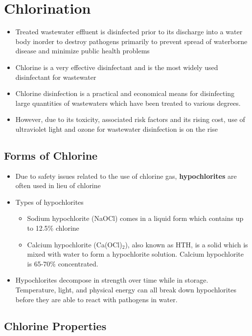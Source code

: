 \newpage
\section{Chlorination}


\begin{itemize}
\item Treated wastewater effluent is disinfected prior to its discharge into a water body inorder to destroy pathogens primarily to prevent spread of waterborne disease and minimize public health problems
\item Chlorine is a very effective disinfectant and is the most widely used disinfectant for wastewater 
\item Chlorine disinfection is a practical and economical means for disinfecting large quantities of wastewaters which have been treated to various degrees. 
\item However, due to its toxicity, associated risk factors and its rising cost, use of ultraviolet light and ozone for wastewater disinfection is on the rise
\end{itemize}


\subsection{Forms of Chlorine}

\begin{itemize}
	\item Due to safety issues related to the use of chlorine gas, 			\textbf{hypochlorites} are often used in lieu of chlorine
	\item Types of hypochlorites
	\begin{itemize}
	\item Sodium hypochlorite (NaOCl) comes in a liquid form which contains up to 12.5\% chlorine
	\item Calcium hypochlorite (Ca(OCl)$_2$), also known as HTH, is a solid which is mixed with water to form a hypochlorite solution. Calcium hypochlorite is 65-70\% concentrated.
	\end{itemize}
	\item Hypochlorites decompose in strength over time while in storage. Temperature, light, and physical energy can all break down hypochlorites before they are able to react with pathogens in water. 

\end{itemize} 

\subsection{Chlorine Properties}

